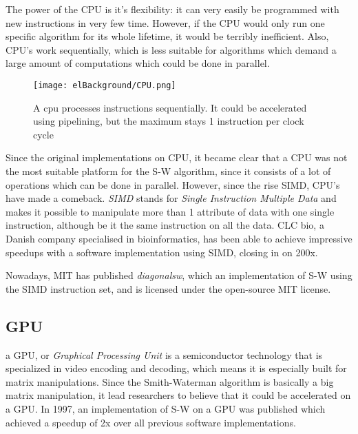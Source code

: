 The power of the CPU is it's flexibility: it can very easily be programmed with new instructions in very few time. However, if the CPU would only run one specific algorithm for its whole lifetime, it would be terribly inefficient. Also, CPU's work sequentially, which is less suitable for algorithms which demand a large amount of computations which could be done in parallel.

\begin{figure}[H]
	\centering
	\texttt{[image: elBackground/CPU.png]}
	\caption{A cpu processes instructions sequentially. It could be accelerated using pipelining, but the maximum stays 1 instruction per clock cycle}
	\label{fig:cpu}
\end{figure}

Since the original implementations on CPU, it became clear that a CPU was not the most suitable platform for the S-W algorithm, since it consists of a lot of operations which can be done in parallel. However, since the rise SIMD, CPU's have made a comeback. \emph{SIMD} stands for \emph{Single Instruction Multiple Data} and makes it possible to manipulate more than 1 attribute of data with one single instruction, although be it the same instruction on all the data. CLC bio, a Danish company specialised in bioinformatics, has been able to achieve impressive speedups with a software implementation using SIMD, closing in on 200x.

Nowadays, MIT has published \emph{diagonalsw}, which an implementation of S-W using the SIMD instruction set, and is licensed under the open-source MIT license.

\subsection{GPU}

a GPU, or \emph{Graphical Processing Unit} is a semiconductor technology that is specialized in video encoding and decoding, which means it is especially built for matrix manipulations. Since the Smith-Waterman algorithm is basically a big matrix manipulation, it lead researchers to believe that it could be accelerated on a GPU. In 1997, an implementation of S-W on a GPU was published %
which achieved a speedup of 2x over all previous software implementations.

